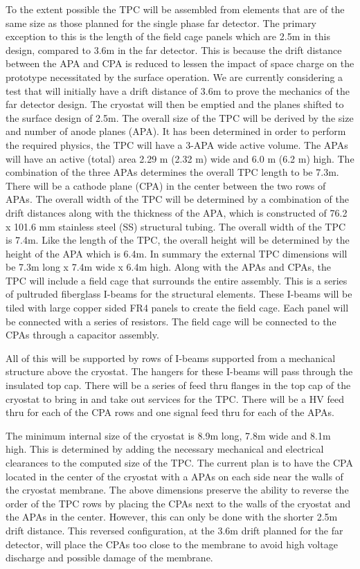 To the extent possible the TPC will be assembled from elements that are of the same size as those planned for the single phase far detector.  The primary exception to this is the length of the field cage panels which are 2.5m in this design, compared to 3.6m in the far detector. This is because the drift distance between the APA and CPA is reduced to lessen the impact of space charge on the prototype necessitated by the surface operation. We are currently considering a test that will initially have a drift distance of 3.6m to prove the mechanics of the far detector design.  The cryostat will then be emptied and the planes shifted to the surface design of 2.5m.  The overall size of the TPC will be derived by the size and number of anode planes (APA).  It has been determined in order to perform the required physics, the TPC will have a 3-APA wide active volume.  The APAs will have an active (total) area 2.29 m (2.32 m) wide and 6.0 m (6.2 m) high. The combination of the three APAs determines the overall TPC length to be 7.3m. There will be a cathode plane (CPA) in the center between the two rows of APAs.  The overall width of the TPC will be determined by a combination of the drift distances along with the thickness of the APA, which is constructed of 76.2 x 101.6 mm stainless steel (SS) structural tubing.  The overall width of the TPC is 7.4m.  Like the length of the TPC, the overall height will be determined by the height of the APA which is 6.4m.  In summary the external TPC dimensions will be 7.3m long x 7.4m wide x 6.4m high. Along with the APAs and CPAs, the TPC will include a field cage that surrounds the entire assembly.  This is a series of pultruded fiberglass I-beams for the structural elements.  These I-beams will be tiled with large copper sided FR4 panels to create the field cage.  Each panel will be connected with a series of resistors.  The field cage will be connected to the CPAs through a capacitor assembly.

All of this will be supported by rows of I-beams supported from a mechanical structure above the cryostat.  The hangers for these I-beams will pass through the insulated top cap.  There will be a series of feed thru flanges in the top cap of the cryostat to bring in and take out services for the TPC.  There will be a HV feed thru for each of the CPA rows and one signal feed thru for each of the APAs.


The minimum internal size of the cryostat is 8.9m long, 7.8m wide and 8.1m high.  This is determined by adding the necessary mechanical and electrical clearances to the computed size of the TPC.  
The current plan is to have the CPA located in the center of the cryostat with a APAs on each side near the walls of the cryostat membrane.  The above dimensions preserve the ability to reverse the order of the TPC rows by placing the CPAs next to the walls of the cryostat and the APAs in the center.  However, this can only be done with the shorter 2.5m drift distance.  This reversed configuration, at the 3.6m drift planned for the far detector, will place the CPAs too close to the membrane to avoid high voltage discharge and possible damage of the membrane.  


